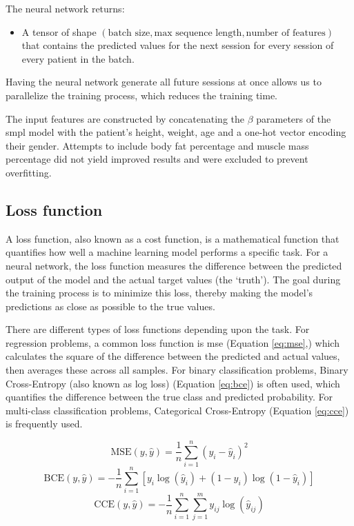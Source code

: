 The neural network returns:

\begin{itemize}
	\item A tensor of shape $(\text{batch size}, \text{max sequence length}, \text{number
			      of features})$ that contains the predicted values for the next session for
	      every session of every patient in the batch.
\end{itemize}

Having the neural network generate all future sessions at once allows us to
parallelize the training process, which reduces the training time.

The input features are constructed by concatenating the $\beta$ parameters of
the \gls{smpl} model with the patient's height, weight, age and a one-hot
vector encoding their gender. Attempts to include body fat percentage and
muscle mass percentage did not yield improved results and were excluded to
prevent overfitting.

\subsection{Loss function}

A loss function, also known as a cost function, is a mathematical function that
quantifies how well a machine learning model performs a specific task. For a
neural network, the loss function measures the difference between the predicted
output of the model and the actual target values (the `truth'). The goal during
the training process is to minimize this loss, thereby making the model's
predictions as close as possible to the true values.

There are different types of loss functions depending upon the task. For
regression problems, a common loss function is \gls{mse} (Equation
\ref{eq:mse},) which calculates the square of the difference between the
predicted and actual values, then averages these across all samples. For binary
classification problems, Binary Cross-Entropy (also known as log loss)
(Equation \ref{eq:bce}) is often used, which quantifies the difference between
the true class and predicted probability. For multi-class classification
problems, Categorical Cross-Entropy (Equation \ref{eq:cce}) is frequently used.

\begin{equation}
	\text{MSE}(y, \hat{y}) = \frac{1}{n} \sum_{i=1}^{n}(y_i - \hat{y}_i)^2
	\label{eq:mse}
\end{equation}
\begin{equation}
	\text{BCE}(y, \hat{y}) = -\frac{1}{n} \sum_{i=1}^{n} [y_i \log(\hat{y}_i) + (1 - y_i) \log(1 - \hat{y}_i)]
	\label{eq:bce}
\end{equation}
\begin{equation}
	\text{CCE}(y, \hat{y}) = -\frac{1}{n} \sum_{i=1}^{n} \sum_{j=1}^{m} y_{ij} \log(\hat{y}_{ij})
	\label{eq:cce}
\end{equation}

